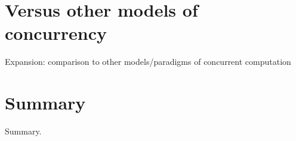 \documentclass[A4]{article}
\begin{document}
\section{Versus other models of concurrency}
Expansion: comparison to other models/paradigms of concurrent computation

\section{Summary}
\label{summary}
Summary.

\nocite{robotron,
stonx,vice,650sim,herculessim,zib,4004,thermal1,thermal2,rojas}




\end{document}
